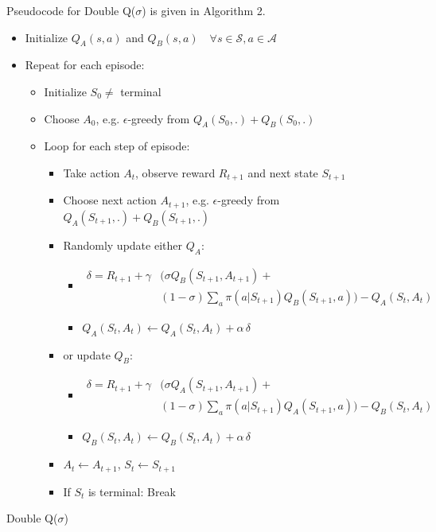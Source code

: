 \documentclass{article} %
\begin{document}
Pseudocode for Double Q($\sigma$) is given in Algorithm 2. 

\begin{pseudocode}
\begin{itemize}
  \item[] Initialize $Q_A(s, a)$ and $Q_B(s, a) \quad \forall s \in \mathcal{S}, a \in \mathcal{A}$ 
  \item[] Repeat for each episode:
  \begin{itemize}
  \item[] Initialize $S_0 \neq$ terminal
  \item[] Choose $A_0$, e.g. $\epsilon$-greedy from $Q_A(S_0, .) + Q_B(S_0, .)$
  \item[] Loop for each step of episode:
  \begin{itemize}
    \item[] Take action $A_t$, observe reward $R_{t+1}$ and next state $S_{t+1}$
    \item[] Choose next action $A_{t+1}$, e.g. $\epsilon$-greedy from $Q_A(S_{t+1}, .) + Q_B(S_{t+1}, .)$
    \item[] Randomly update either $Q_A$:
    \begin{itemize}
    \item[] $\begin{aligned}
        \delta = R_{t+1} + \gamma &( \sigma Q_B(S_{t+1}, A_{t+1}) +  \\ &(1 - \sigma) \sum_a \pi(a|S_{t+1}) Q_B(S_{t+1}, a) ) -  Q_A(S_t, A_t)
    \end{aligned}$
    \item[] $Q_A(S_t, A_t) \leftarrow Q_A(S_t, A_t) + \alpha \, \delta $
    \end{itemize} \vspace{0.1cm}
    \item[] or update $Q_B$:
    \begin{itemize}
    \item[] $\begin{aligned}
        \delta = R_{t+1} + \gamma &( \sigma Q_A(S_{t+1}, A_{t+1}) + \\ &(1 - \sigma) \sum_a \pi(a|S_{t+1}) Q_A(S_{t+1}, a) ) - Q_B(S_t, A_t)
        \end{aligned}$
    \item[] $Q_B(S_t, A_t) \leftarrow Q_B(S_t, A_t) + \alpha \, \delta $
    \end{itemize}
    \item[] $A_t \leftarrow A_{t+1}$, $S_t \leftarrow S_{t+1}$
    \item[] If $S_t$ is terminal: Break
  \end{itemize}
\end{itemize}
\end{itemize}
\caption{Double Q($\sigma$)}
\label{algorithm2}
\end{pseudocode}
\end{document}
